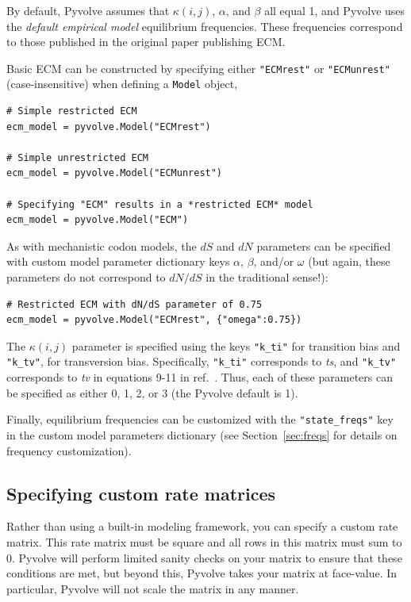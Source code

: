 \documentclass{article}
\newcommand{\code}[1]{\texttt{\small{#1}}}
\begin{document}
By default, Pyvolve assumes that $\kappa(i,j)$, $\alpha$, and $\beta$ all equal 1, and Pyvolve uses the \emph{default empirical model} equilibrium frequencies. These frequencies correspond to those published in the original paper publishing ECM.

Basic ECM can be constructed by specifying either \code{"ECMrest"} or \code{"ECMunrest"} (case-insensitive) when defining a \code{Model} object,
\begin{lstlisting}
# Simple restricted ECM
ecm_model = pyvolve.Model("ECMrest")

# Simple unrestricted ECM
ecm_model = pyvolve.Model("ECMunrest")

# Specifying "ECM" results in a *restricted ECM* model
ecm_model = pyvolve.Model("ECM")
\end{lstlisting}

As with mechanistic codon models, the $dS$ and $dN$ parameters can be specified with custom model parameter dictionary keys $\alpha$, $\beta$, and/or $\omega$ (but again, these parameters do not correspond to $dN/dS$ in the traditional sense!):
\begin{lstlisting}
# Restricted ECM with dN/dS parameter of 0.75
ecm_model = pyvolve.Model("ECMrest", {"omega":0.75})
\end{lstlisting}

The $\kappa(i,j)$ parameter is specified using the keys \code{"k\_ti"} for transition bias and \code{"k\_tv"}, for transversion bias. Specifically, \code{"k\_ti"} corresponds to \emph{ts}, and \code{"k\_tv"} corresponds to \emph{tv} in equations 9-11 in ref.\ \citep{ECM}. Thus, each of these parameters can be specified as either 0, 1, 2, or 3 (the Pyvolve default is 1).


Finally, equilibrium frequencies can be customized with the \code{"state\_freqs"} key in the custom model parameters dictionary (see Section~\ref{sec:freqs} for details on frequency customization).



\subsection{Specifying custom rate matrices}\label{sec:custom}

Rather than using a built-in modeling framework, you can specify a custom rate matrix. This rate matrix must be square and all rows in this matrix must sum to 0. Pyvolve will perform limited sanity checks on your matrix to ensure that these conditions are met, but beyond this, Pyvolve takes your matrix at face-value. In particular, Pyvolve will not scale the matrix in any manner.
\end{document}
